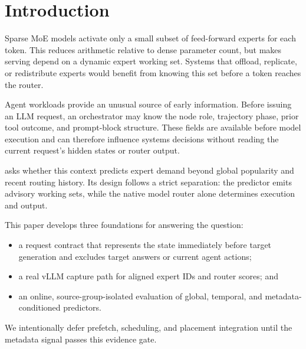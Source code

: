 \section{Introduction}

Sparse MoE models activate only a small subset of feed-forward experts for each
token. This reduces arithmetic relative to dense parameter count, but makes
serving depend on a dynamic expert working set. Systems that offload, replicate,
or redistribute experts would benefit from knowing this set before a token
reaches the router.

Agent workloads provide an unusual source of early information. Before issuing
an LLM request, an orchestrator may know the node role, trajectory phase, prior
tool outcome, and prompt-block structure. These fields are available before
model execution and can therefore influence systems decisions without reading
the current request's hidden states or router output.

\project asks whether this context predicts expert demand beyond global
popularity and recent routing history. Its design follows a strict separation:
the predictor emits advisory working sets, while the native model router alone
determines execution and output.

This paper develops three foundations for answering the question:
\begin{itemize}[leftmargin=*]
  \item a request contract that represents the state immediately before target
        generation and excludes target answers or current agent actions;
  \item a real vLLM capture path for aligned expert IDs and router scores; and
  \item an online, source-group-isolated evaluation of global, temporal, and
        metadata-conditioned predictors.
\end{itemize}

We intentionally defer prefetch, scheduling, and placement integration until
the metadata signal passes this evidence gate.
